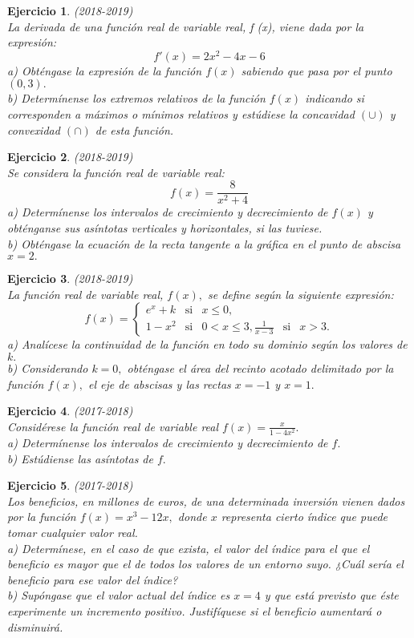 \documentclass[12pt, a4paper]{amsart}
\newtheorem{ejer}{Ejercicio}
\begin{document}
\begin{ejer}\em (2018-2019)\\
La derivada de una función real de variable real, f (x), viene dada por la expresión:
\[f'(x) = 2x^2 - 4x - 6\]
a) Obténgase la expresión de la función $f(x)$ sabiendo que pasa por el punto $(0, 3).$\\
b) Determínense los extremos relativos de la función $f(x)$ indicando si corresponden a máximos o mínimos relativos y estúdiese la concavidad $(\cup)$ y convexidad $(\cap)$ de esta función.
\end{ejer}

\begin{ejer}\em (2018-2019)\\
Se considera la función real de variable real:
\[f(x)=\frac{8}{x^2+4}\]
a) Determínense los intervalos de crecimiento y decrecimiento de $f(x)$ y obténganse sus asíntotas verticales y horizontales, si las tuviese.\\
b) Obténgase la ecuación de la recta tangente a la gráfica en el punto de abscisa $x = 2.$
\end{ejer}

\begin{ejer}\em (2018-2019)\\
La función real de variable real, $f(x),$ se define según la siguiente expresión:
\[
f(x)=\left \{ \begin{matrix}
e^x+k & \text{si} & x\leq 0,\\
1-x^2 & \text{si} & 0<x\leq 3,
\frac{1}{x-3} & \text{si} & x> 3.
\end{matrix}\right.
\]
a) Analícese la continuidad de la función en todo su dominio según los valores de $k.$\\
b) Considerando $k = 0,$ obténgase el área del recinto acotado delimitado por la función $f (x),$ el eje de abscisas y las rectas $x = - 1$ y $x = 1.$
\end{ejer}

\begin{ejer}\em (2017-2018)\\
Considérese la función real de variable real $f(x)=\frac{x}{1-4x^2}.$\\
a) Determínense los intervalos de crecimiento y decrecimiento de $f.$\\
b) Estúdiense las asíntotas de $f.$
\end{ejer}

\begin{ejer}\em (2017-2018)\\
Los beneficios, en millones de euros, de una determinada inversión vienen dados por la función $f(x) = x^3 - 12x,$ donde $x$ representa cierto índice que puede tomar cualquier valor real.\\
a) Determínese, en el caso de que exista, el valor del índice para el que el beneficio es mayor que el de todos los valores de un entorno suyo. ¿Cuál sería el beneficio para ese valor del índice?\\
b) Supóngase que el valor actual del índice es $x = 4$ y que está previsto que éste experimente un incremento positivo. Justifíquese si el beneficio aumentará o disminuirá.
\end{ejer}
\end{document}
